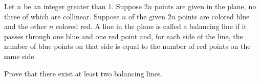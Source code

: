 Let $n$ be an integer greater than 1. Suppose $2n$ points are given in the plane, no three of which are collinear. Suppose $n$ of the given $2n$ points are colored blue and the other $n$ colored red. A line in the plane is called a balancing line if it passes through one blue and one red point and, for each side of the line, the number of blue points on that side is equal to the number of red points on the same side.

Prove that there exist at least two balancing lines.